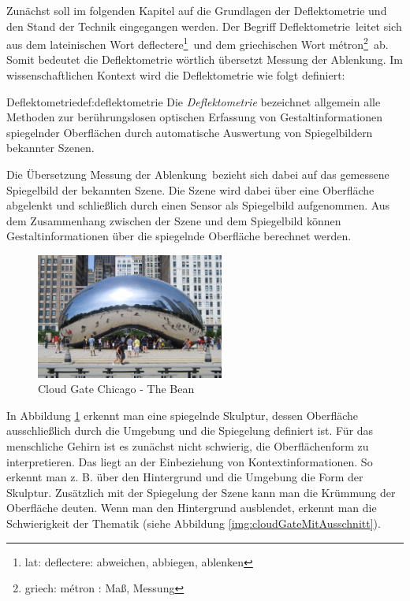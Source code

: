 Zunächst soll im folgenden Kapitel auf die Grundlagen der Deflektometrie und den Stand der Technik eingegangen werden.
Der Begriff \glqq Deflektometrie\grqq ~leitet sich aus dem lateinischen Wort \glqq deflectere\footnote{lat: deflectere: abweichen, abbiegen, ablenken}\grqq ~und dem griechischen Wort \glqq métron\footnote{griech: \textgreek{métron} : Maß, Messung}\grqq ~ab.
Somit bedeutet die Deflektometrie wörtlich übersetzt \glqq Messung der Ablenkung\grqq.
Im wissenschaftlichen Kontext wird die Deflektometrie wie folgt definiert:

\begin{Definition}{Deflektometrie}{def:deflektometrie}
	Die \textit{Deflektometrie} bezeichnet allgemein alle Methoden zur berührungslosen optischen Erfassung von Gestaltinformationen spiegelnder Oberflächen durch automatische Auswertung von Spiegelbildern bekannter Szenen. \cite{fraunhofer}
\end{Definition}

\noindent
Die Übersetzung \glqq Messung der Ablenkung\grqq ~bezieht sich dabei auf das gemessene Spiegelbild der bekannten Szene.
Die Szene wird dabei über eine Oberfläche abgelenkt und schließlich durch einen Sensor als Spiegelbild aufgenommen.
Aus dem Zusammenhang zwischen der Szene und dem Spiegelbild können Gestaltinformationen über die spiegelnde Oberfläche berechnet werden.

\begin{figure}[H]
	\centering
	\includegraphics[width=0.55\textwidth]{02_grundlagenDerDeflektometrie/figures/cloud-gate-chicago}
	\caption[Cloud Gate Chicaog - The Bean]{Cloud Gate Chicago - The Bean \cite{cloudGateChicago}}
	\label{img:cloudGateChicago}
\end{figure}

\noindent
In Abbildung \ref{img:cloudGateChicago} erkennt man eine spiegelnde Skulptur, dessen Oberfläche ausschließlich durch die Umgebung und die Spiegelung definiert ist.
Für das menschliche Gehirn ist es zunächst nicht schwierig, die Oberflächenform zu interpretieren.
Das liegt an der Einbeziehung von Kontextinformationen.
So erkennt man z. B. über den Hintergrund und die Umgebung die Form der Skulptur.
Zusätzlich mit der Spiegelung der Szene kann man die Krümmung der Oberfläche deuten.
Wenn man den Hintergrund ausblendet, erkennt man die Schwierigkeit der Thematik (siehe Abbildung \ref{img:cloudGateMitAusschnitt}).

